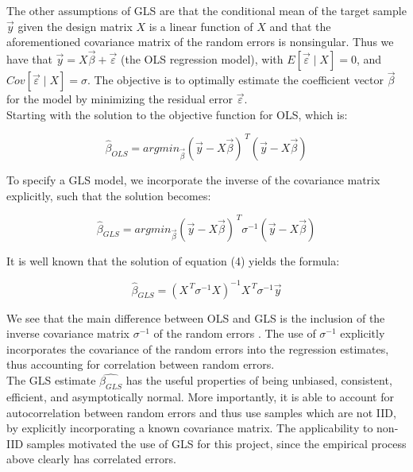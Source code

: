 \documentclass[12pt]{article}
\begin{document}
The other assumptions of GLS are that the conditional mean of the target sample $\vec{y}$ given the design matrix $X$ is a linear function of $X$ and that the aforementioned covariance matrix  of the random errors is nonsingular. Thus we have that $\vec{y}=X\vec{\beta}+\vec{\varepsilon}$ (the OLS regression model), with $E[\vec{\varepsilon} \mid X]=0$, and $Cov[\vec{\varepsilon} \mid X]=\sigma$. The objective is to optimally estimate the coefficient vector $\vec{\beta}$ for the model by minimizing the residual error $\vec{\varepsilon}$. \\

Starting with the solution to the objective function for OLS, which is:

\begin{equation}
\hat{\beta}_{OLS}=argmin_{\vec{\beta}}(\vec{y}-X\vec{\beta})^{\, T}(\vec{y}-X\vec{\beta})\label{eq3}
\end{equation}

To specify a GLS model, we incorporate the inverse of the covariance matrix explicitly, such that the solution becomes:

\begin{equation}
\hat{\beta}_{GLS}=argmin_{\vec{\beta}}(\vec{y}-X\vec{\beta})^{\, T}\sigma^{-1}(\vec{y}-X\vec{\beta})\label{eq4}
\end{equation}

It is well known that the solution of equation (4) yields the formula:

\begin{equation}
\hat{\beta}_{GLS}=(X^{\, T}\sigma^{-1}X)^{-1}X^{\, T}\sigma^{-1}\vec{y}\label{eq5}
\end{equation}

We see that the main difference between OLS and GLS is the inclusion of the inverse covariance matrix $\sigma^{-1}$ of the random errors . The use of $\sigma^{-1}$ explicitly incorporates the covariance of the random errors into the regression estimates, thus accounting for correlation between random errors.\\

The GLS estimate $\hat{\beta_{GLS}}$ has the useful properties of being unbiased, consistent, efficient, and asymptotically normal. More importantly, it is able to account for autocorrelation between random errors and thus use samples which are not IID, by explicitly incorporating a known covariance matrix. The applicability to non-IID samples motivated the use of GLS for this project, since the empirical process above clearly has correlated errors.
\end{document}
